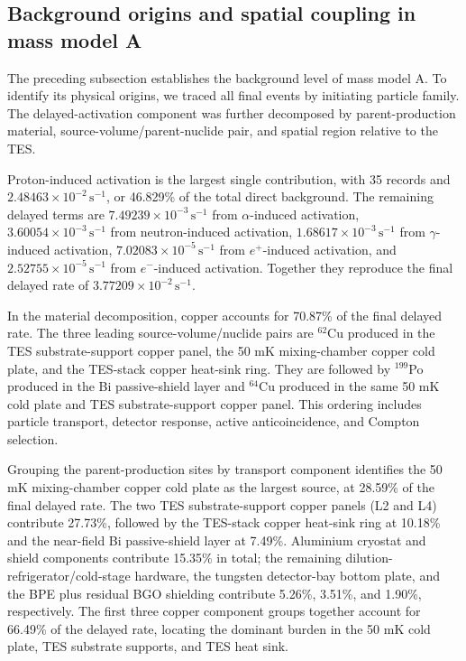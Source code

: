 \documentclass[11pt]{article}
\newcommand{\cps}{\ensuremath{\,\mathrm{s^{-1}}}}
\begin{document}
\subsection{Background origins and spatial coupling in mass model A}
\label{subsec:mass_model_a_origins}



\begingroup

The preceding subsection establishes the background level of mass model A. To identify its physical origins, we traced all final events by initiating particle family. The delayed-activation component was further decomposed by parent-production material, source-volume/parent-nuclide pair, and spatial region relative to the TES.

Proton-induced activation is the largest single contribution, with 35 records and $2.48463\times10^{-2}\cps$, or 46.829\% of the total direct background. The remaining delayed terms are $7.49239\times10^{-3}\cps$ from $\alpha$-induced activation, $3.60054\times10^{-3}\cps$ from neutron-induced activation, $1.68617\times10^{-3}\cps$ from $\gamma$-induced activation, $7.02083\times10^{-5}\cps$ from $e^+$-induced activation, and $2.52755\times10^{-5}\cps$ from $e^-$-induced activation. Together they reproduce the final delayed rate of $3.77209\times10^{-2}\cps$.

In the material decomposition, copper accounts for 70.87\% of the final delayed rate. The three leading source-volume/nuclide pairs are $^{62}$Cu produced in the TES substrate-support copper panel, the 50 mK mixing-chamber copper cold plate, and the TES-stack copper heat-sink ring. They are followed by $^{199}$Po produced in the Bi passive-shield layer and $^{64}$Cu produced in the same 50 mK cold plate and TES substrate-support copper panel. This ordering includes particle transport, detector response, active anticoincidence, and Compton selection.

Grouping the parent-production sites by transport component identifies the 50 mK mixing-chamber copper cold plate as the largest source, at 28.59\% of the final delayed rate. The two TES substrate-support copper panels (L2 and L4) contribute 27.73\%, followed by the TES-stack copper heat-sink ring at 10.18\% and the near-field Bi passive-shield layer at 7.49\%. Aluminium cryostat and shield components contribute 15.35\% in total; the remaining dilution-refrigerator/cold-stage hardware, the tungsten detector-bay bottom plate, and the BPE plus residual BGO shielding contribute 5.26\%, 3.51\%, and 1.90\%, respectively. The first three copper component groups together account for 66.49\% of the delayed rate, locating the dominant burden in the 50 mK cold plate, TES substrate supports, and TES heat sink.
\end{document}
